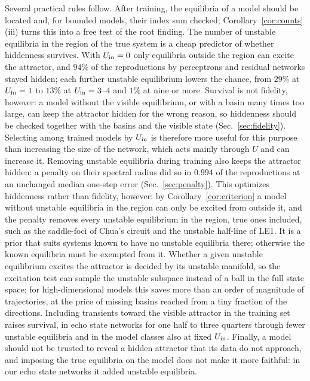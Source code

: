 Several practical rules follow. After training, the equilibria of a model should be located and, for bounded models, their
index sum checked; Corollary~\ref{cor:counts}(iii) turns this into a free test of the root finding. The number of unstable
equilibria in the region of the true system is a cheap predictor of whether hiddenness survives. With $U_{\mathrm{in}}=0$ only equilibria outside the
region can excite the attractor, and $94\%$ of the reproductions by perceptrons and residual networks stayed hidden; each
further unstable equilibrium lowers the chance, from $29\%$ at $U_{\mathrm{in}}=1$ to $13\%$ at $U_{\mathrm{in}}=3$--$4$ and $1\%$ at nine or more. Survival is not fidelity, however: a model without the visible
equilibrium, or with a basin many times too large, can keep the attractor hidden for the wrong reason, so hiddenness should
be checked together with the basins and the visible state (Sec.~\ref{sec:fidelity}). Selecting among trained
models by $U_{\mathrm{in}}$ is therefore more useful for this purpose than increasing the size of the network, which acts mainly through
$U$ and can increase it. Removing unstable equilibria during training also keeps the attractor hidden: a penalty on their
spectral radius did so in $0.994$ of the reproductions at an unchanged median one-step error (Sec.~\ref{sec:penalty}). This
optimizes hiddenness rather than fidelity, however: by Corollary~\ref{cor:criterion} a model without unstable equilibria
in the region can only be excited from outside it, and the penalty removes every unstable equilibrium in the region, true
ones included, such as the saddle-foci of Chua's circuit and the unstable half-line of LE1. It is a prior that suits systems
known to have no unstable equilibria there; otherwise the known equilibria must be exempted from it.
Whether a given unstable equilibrium excites the attractor is decided by its unstable manifold, so the excitation test can
sample the unstable subspace instead of a ball in the full state space; for high-dimensional models this saves more than an
order of magnitude of trajectories, at the price of missing basins reached from a tiny fraction of the directions. Including
transients toward the visible attractor in the training set raises survival, in echo state networks for one half to three
quarters through fewer unstable equilibria and in the model classes also at fixed $U_{\mathrm{in}}$. Finally, a model should not be trusted to reveal a hidden attractor that its data do
not approach, and imposing the true equilibria on the model does not make it more faithful: in our echo state networks it
added unstable equilibria.

